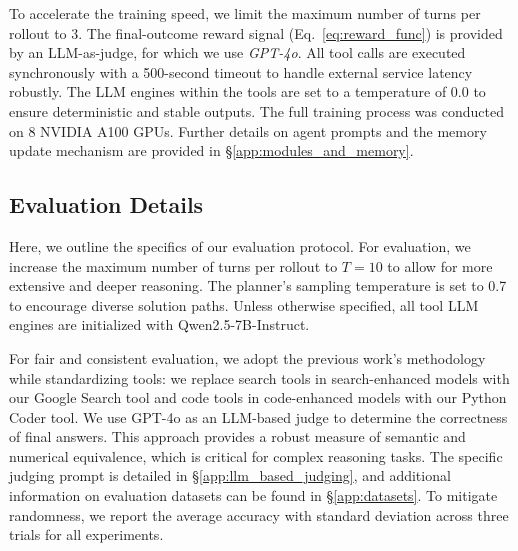 To accelerate the training speed, we limit the maximum number of turns per rollout to $3$. The final-outcome reward signal (Eq.~\ref{eq:reward_func}) is provided by an LLM-as-judge, for which we use \textit{GPT-4o}. All tool calls are executed synchronously with a 500-second timeout to handle external service latency robustly. The LLM engines within the tools are set to a temperature of 0.0 to ensure deterministic and stable outputs. The full training process was conducted on 8 NVIDIA A100 GPUs. Further details on agent prompts and the memory update mechanism are provided in \S\ref{app:modules_and_memory}.


\subsection{Evaluation Details}
\label{app:eval_details}
Here, we outline the specifics of our evaluation protocol. For evaluation, we increase the maximum number of turns per rollout to $T=10$ to allow for more extensive and deeper reasoning. The planner's sampling temperature is set to 0.7 to encourage diverse solution paths. Unless otherwise specified, all tool LLM engines are initialized with Qwen2.5-7B-Instruct.

For fair and consistent evaluation, we adopt the previous work's methodology while standardizing tools: we replace search tools in search-enhanced models with our Google Search tool and code tools in code-enhanced models with our Python Coder tool. We use GPT-4o as an LLM-based judge to determine the correctness of final answers. This approach provides a robust measure of semantic and numerical equivalence, which is critical for complex reasoning tasks. The specific judging prompt is detailed in \S\ref{app:llm_based_judging}, and additional information on evaluation datasets can be found in \S\ref{app:datasets}. To mitigate randomness, we report the average accuracy with standard deviation across three trials for all experiments.


